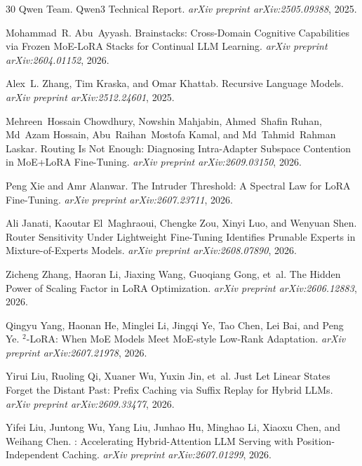 \documentclass[11pt,a4paper]{article}
\begin{document}
\begin{thebibliography}{30}
{Qwen Team}.
\newblock Qwen3 Technical Report.
\newblock \emph{arXiv preprint arXiv:2505.09388}, 2025.

Mohammad~R. Abu~Ayyash.
\newblock Brainstacks: Cross-Domain Cognitive Capabilities via Frozen {MoE-LoRA} Stacks for Continual {LLM} Learning.
\newblock \emph{arXiv preprint arXiv:2604.01152}, 2026.

Alex~L. Zhang, Tim Kraska, and Omar Khattab.
\newblock Recursive Language Models.
\newblock \emph{arXiv preprint arXiv:2512.24601}, 2025.

Mehreen~Hossain Chowdhury, Nowshin Mahjabin, Ahmed~Shafin Ruhan, Md~Azam Hossain, Abu~Raihan~Mostofa Kamal, and Md~Tahmid~Rahman Laskar.
\newblock Routing Is Not Enough: Diagnosing Intra-Adapter Subspace Contention in {MoE+LoRA} Fine-Tuning.
\newblock \emph{arXiv preprint arXiv:2609.03150}, 2026.

Peng Xie and Amr Alanwar.
\newblock The Intruder Threshold: A Spectral Law for {LoRA} Fine-Tuning.
\newblock \emph{arXiv preprint arXiv:2607.23711}, 2026.

Ali Janati, Kaoutar El~Maghraoui, Chengke Zou, Xinyi Luo, and Wenyuan Shen.
\newblock Router Sensitivity Under Lightweight Fine-Tuning Identifies Prunable Experts in Mixture-of-Experts Models.
\newblock \emph{arXiv preprint arXiv:2608.07890}, 2026.

Zicheng Zhang, Haoran Li, Jiaxing Wang, Guoqiang Gong, et~al.
\newblock The Hidden Power of Scaling Factor in {LoRA} Optimization.
\newblock \emph{arXiv preprint arXiv:2606.12883}, 2026.

Qingyu Yang, Haonan He, Minglei Li, Jingqi Ye, Tao Chen, Lei Bai, and Peng Ye.
$^2$-{LoRA}: When {MoE} Models Meet {MoE}-style Low-Rank Adaptation.
\newblock \emph{arXiv preprint arXiv:2607.21978}, 2026.

Yirui Liu, Ruoling Qi, Xuaner Wu, Yuxin Jin, et~al.
\newblock Just Let Linear States Forget the Distant Past: Prefix Caching via Suffix Replay for Hybrid {LLMs}.
\newblock \emph{arXiv preprint arXiv:2609.33477}, 2026.

Yifei Liu, Juntong Wu, Yang Liu, Junhao Hu, Minghao Li, Xiaoxu Chen, and Weihang Chen.
: Accelerating Hybrid-Attention {LLM} Serving with Position-Independent Caching.
\newblock \emph{arXiv preprint arXiv:2607.01299}, 2026.


\end{thebibliography}
\end{document}
